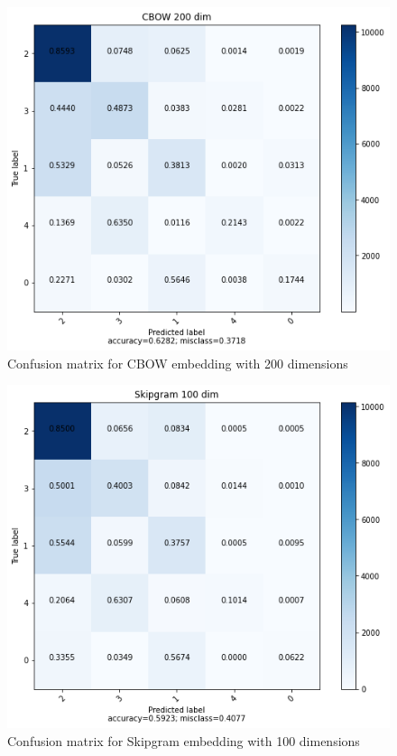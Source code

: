 \documentclass{article}
\begin{document}
\begin{figure}[ht]
    \centering
    \includegraphics[scale=0.4]{../code/images/CBow200.png}
    \caption{Confusion matrix for CBOW embedding with 200 dimensions}
    \label{fig:c200}
\end{figure}
\begin{figure}[ht]
    \centering
    \includegraphics[scale=0.4]{../code/images/SkipGram100.png}
    \caption{Confusion matrix for Skipgram embedding with 100 dimensions}
    \label{fig:s100}
\end{figure}
\end{document}

